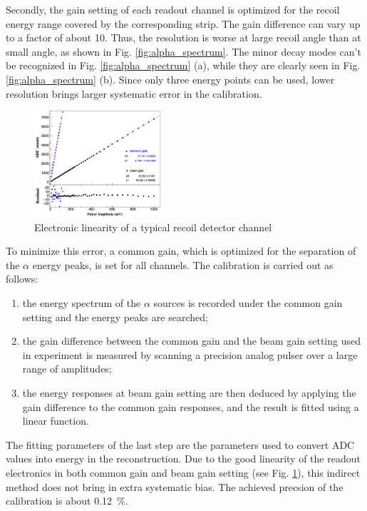 \documentclass[number,5p]{elsarticle}
\begin{document}
Secondly, the gain setting of each readout channel is optimized for the recoil
energy range covered by the corresponding strip.
The gain difference can vary up to a factor of about 10.
Thus, the resolution is worse at large recoil angle than at small angle, as shown in Fig. \ref{fig:alpha_spectrum}.
The minor decay modes can't be recognized in Fig. \ref{fig:alpha_spectrum} (a), while they are clearly seen in Fig. \ref{fig:alpha_spectrum} (b).
Since only three energy points can be used, lower resolution brings larger systematic error in the calibration.

\begin{figure}[htbp]
\centering
\includegraphics[width=0.42\textwidth]{./linearity.png}
\caption{Electronic linearity of a typical recoil detector channel}
\label{fig:electronic_linearity}
\end{figure}

To minimize this error, a common gain, which is optimized for the separation of the \(\alpha\) energy peaks, is set for all channels.
The calibration is carried out as follows:
\begin{enumerate}
\item the energy spectrum of the \(\alpha\) sources is recorded under the common gain setting and the energy peaks are searched;
\item the gain difference between the common gain and the beam gain setting used
  in experiment is measured by scanning a precision analog pulser over a large range of amplitudes;
\item the energy responses at beam gain setting are then deduced by applying the gain
  difference to the common gain responses, and the result is fitted using a linear function.
\end{enumerate}
The fitting parameters of the last step are the parameters used to convert ADC
values into energy in the reconstruction.
Due to the good linearity of the readout electronics in both common gain
and beam gain setting (see Fig. \ref{fig:electronic_linearity}), this indirect
method does not bring in extra systematic bias.
The achieved precsion of the calibration is about \SI{0.12}{\percent}.
\end{document}
